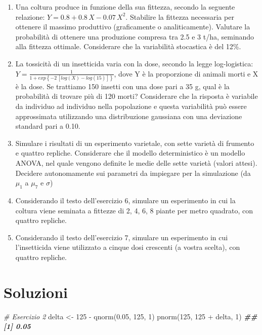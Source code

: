 \documentclass[
  12pt,
]{book}
\newenvironment{Shaded}{\begin{snugshade}}{\end{snugshade}}
\newcommand{\CommentTok}[1]{\textcolor[rgb]{0.56,0.35,0.01}{\textit{#1}}}
\newcommand{\DecValTok}[1]{\textcolor[rgb]{0.00,0.00,0.81}{#1}}
\newcommand{\DocumentationTok}[1]{\textcolor[rgb]{0.56,0.35,0.01}{\textbf{\textit{#1}}}}
\newcommand{\FloatTok}[1]{\textcolor[rgb]{0.00,0.00,0.81}{#1}}
\newcommand{\FunctionTok}[1]{\textcolor[rgb]{0.00,0.00,0.00}{#1}}
\newcommand{\NormalTok}[1]{#1}
\newcommand{\OtherTok}[1]{\textcolor[rgb]{0.56,0.35,0.01}{#1}}
\newcommand{\SpecialCharTok}[1]{\textcolor[rgb]{0.00,0.00,0.00}{#1}}
\begin{document}
\begin{enumerate}
\item
  Una coltura produce in funzione della sua fittezza, secondo la seguente relazione: \(Y = 0.8 + 0.8 \, X - 0.07 \, X^2\). Stabilire la fittezza necessaria per ottenere il massimo produttivo (graficamente o analiticamente). Valutare la probabilità di ottenere una produzione compresa tra 2.5 e 3 t/ha, seminando alla fittezza ottimale. Considerare che la variabilità stocastica è del 12\%.
\item
  La tossicità di un insetticida varia con la dose, secondo la legge log-logistica: \(Y = \frac{1}{1 + exp\left\{ -2 \, \left[log(X) - log(15)\right] \right\}}\), dove Y è la proporzione di animali morti e X è la dose. Se trattiamo 150 insetti con una dose pari a 35 g, qual è la probabilità di trovare più di 120 morti? Considerare che la risposta è variabile da individuo ad individuo nella popolazione e questa variabilità può essere approssimata utilizzando una distribuzione gaussiana con una deviazione standard pari a 0.10.
\item
  Simulare i risultati di un esperimento varietale, con sette varietà di frumento e quattro repliche. Considerare che il modello deterministico è un modello ANOVA, nel quale vengono definite le medie delle sette varietà (valori attesi). Decidere autonomamente sui parametri da impiegare per la simulazione (da \(\mu_1\) a \(\mu_7\) e \(\sigma\))
\item
  Considerando il testo dell'esercizio 6, simulare un esperimento in cui la coltura viene seminata a fittezze di 2, 4, 6, 8 piante per metro quadrato, con quattro repliche.
\item
  Considerando il testo dell'esercizio 7, simulare un esperimento in cui l'insetticida viene utilizzato a cinque dosi crescenti (a vostra scelta), con quattro repliche.
\end{enumerate}

\hypertarget{soluzioni}{%
\section{Soluzioni}\label{soluzioni}}

\begin{Shaded}
\begin{Highlighting}[]
\CommentTok{\# Esercizio 2}
\NormalTok{delta }\OtherTok{\textless{}{-}} \DecValTok{125} \SpecialCharTok{{-}} \FunctionTok{qnorm}\NormalTok{(}\FloatTok{0.05}\NormalTok{, }\DecValTok{125}\NormalTok{, }\DecValTok{1}\NormalTok{)}
\FunctionTok{pnorm}\NormalTok{(}\DecValTok{125}\NormalTok{, }\DecValTok{125} \SpecialCharTok{+}\NormalTok{ delta, }\DecValTok{1}\NormalTok{)}
\DocumentationTok{\#\# [1] 0.05}
\end{Highlighting}
\end{Shaded}
\end{document}
